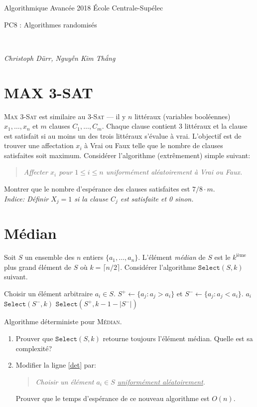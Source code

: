 \documentclass[12pt]{article}
\newcommand{\MakeScribeTop}[1]{
\noindent
\begin{framed}
\noindent
 Algorithmique Avancée 2018
 \hfill
 École Centrale-Supélec
 \\[1em]
 \centerline{ \Large
#1
 }
 \\[1em]
\centerline{  \it Christoph Dürr, Nguyễn Kim Thắng}
\end{framed}
}
\begin{document}
    \MakeScribeTop{PC8 : Algorithmes randomisés}



\section{MAX 3-SAT}

\textsc{Max 3-Sat} est similaire au \textsc{3-Sat} --- il y $n$ littéraux (variables booléennes) $x_{1}, \ldots, x_{n}$
et $m$ clauses $C_{1}, \ldots, C_{m}$. Chaque clause contient 3 littéraux et la clause est satisfait si au moins un des trois littéraux
s'évalue à vrai. L'objectif est de trouver une affectation $x_{i}$ à \textsf{Vrai} ou \textsf{Faux} telle que le nombre de clauses 
satisfaites soit maximum.
Considérer l'algorithme (extrêmement) simple suivant:

\begin{quote}
	\em Affecter $x_{i}$ pour $1 \leq i \leq n$ uniformément aléatoirement à \textsf{Vrai} ou \textsf{Faux}. 
\end{quote} 

Montrer que le nombre d'espérance des clauses satisfaites est $7/8 \cdot m$.\\
\emph{Indice: Définir $X_{j} = 1$ si la clause $C_{j}$ est satisfaite et 0 sinon.}

\section{Médian}

Soit $S$ un ensemble des $n$ entiers $\{a_{1}, \ldots, a_{n}\}$.
L'élément \emph{médian} de $S$ est le $k^{\text{ième}}$ plus grand élément de $S$
où $k = \lceil n/2 \rceil$. Considérer l'algorithme $\texttt{Select}(S,k)$ suivant.

\begin{algorithm}[ht]
\begin{algorithmic}[1]  
\STATE Choisir un élément arbitraire $a_{i} \in S$.	\label{det}
\STATE $S^{+} \gets \{a_{j}: a_{j} > a_{i}\}$ et $S^{-} \gets \{a_{j}: a_{j} < a_{i}\}$.
	\RETURN $a_{i}$
\ELSE
		\RETURN $\texttt{Select}(S^{-},k)$
		\RETURN $\texttt{Select}(S^{+},k - 1 - |S^{-}|)$
	\ENDIF
\ENDIF
\end{algorithmic}
\caption{Algorithme déterministe pour \textsc{Médian}.}
\label{algo:median}
\end{algorithm}

\begin{enumerate}
	\item Prouver que $\texttt{Select}(S,k)$ retourne toujours l'élément médian. Quelle est sa complexité?
	\item Modifier la ligne \ref{det} par:
		\begin{quote}
			\em  Choisir un élément $a_{i} \in S$ \underline{uniformément aléatoirement}.
		\end{quote} 
		Prouver que le temps d'espérance de ce nouveau algorithme est $O(n)$. 
\end{enumerate}
\end{document}
